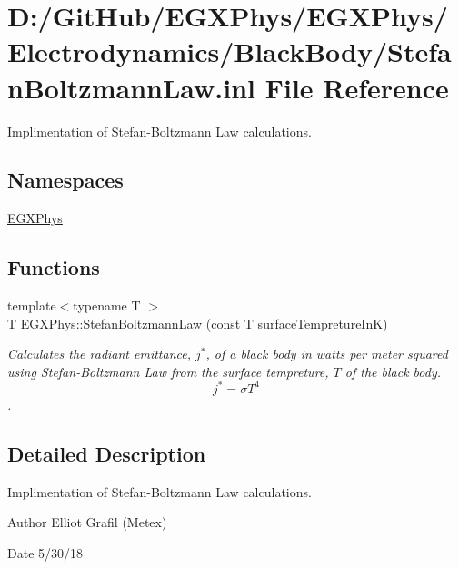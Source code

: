 \hypertarget{_stefan_boltzmann_law_8inl}{}\section{D\+:/\+Git\+Hub/\+E\+G\+X\+Phys/\+E\+G\+X\+Phys/\+Electrodynamics/\+Black\+Body/\+Stefan\+Boltzmann\+Law.inl File Reference}
\label{_stefan_boltzmann_law_8inl}


Implimentation of Stefan-\/\+Boltzmann Law calculations.  


\subsection*{Namespaces}
\begin{DoxyCompactItemize}
\item 
 \mbox{\hyperlink{namespace_e_g_x_phys}{E\+G\+X\+Phys}}
\end{DoxyCompactItemize}
\subsection*{Functions}
\begin{DoxyCompactItemize}
\item 
{\footnotesize template$<$typename T $>$ }\\T \mbox{\hyperlink{group___e_g_x_phys-_electrodynamics-_black_body-_stefan_boltzmann_law_gadfc1c4242b5364a747169569ae5c84ef}{E\+G\+X\+Phys\+::\+Stefan\+Boltzmann\+Law}} (const T surface\+Tempreture\+InK)
\begin{DoxyCompactList}\small\item\em Calculates the radiant emittance, $j^*$, of a black body in watts per meter squared using Stefan-\/\+Boltzmann Law from the surface tempreture, $T$ of the black body. \[j^*=\sigma T^4\]. \end{DoxyCompactList}\end{DoxyCompactItemize}


\subsection{Detailed Description}
Implimentation of Stefan-\/\+Boltzmann Law calculations. 

\begin{DoxyAuthor}{Author}
Elliot Grafil (Metex) 
\end{DoxyAuthor}
\begin{DoxyDate}{Date}
5/30/18 
\end{DoxyDate}
